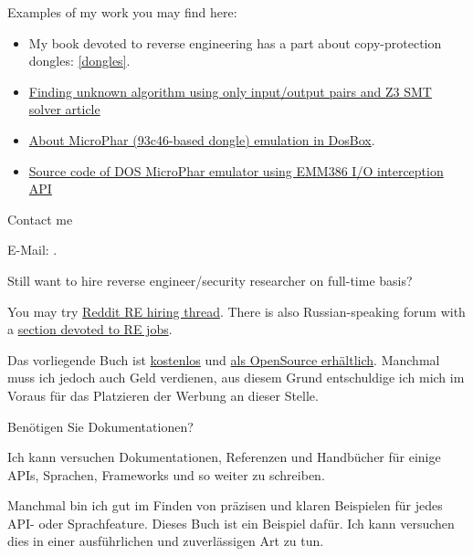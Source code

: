 Examples of my work you may find here:

\begin{itemize}
\item My book devoted to reverse engineering has a part about copy-protection dongles: \ref{dongles}.
\item \href{http://yurichev.com/writings/z3_rockey.pdf}{Finding unknown algorithm using only input/output pairs and Z3 SMT solver article}
\item \href{http://yurichev.com/blog/56/}{About MicroPhar (93c46-based dongle) emulation in DosBox}.
\item \href{http://conus.info/dongle/src/microph.asm}{Source code of DOS MicroPhar emulator using EMM386 I/O interception API}
\end{itemize}

\large Contact me \normalsize

E-Mail: \GTT{\EMAIL}.

\large Still want to hire reverse engineer/security researcher on full-time basis? \normalsize

You may try \href{https://www.reddit.com/r/ReverseEngineering/comments/49cza0/rreverseengineerings_2015_triannual_hiring_thread/}{Reddit RE hiring thread}.
There is also Russian-speaking forum with a \href{https://forum.reverse4you.org/forumdisplay.php?f=252}{section devoted to RE jobs}.

\fi %

\ifdefined\GERMAN

\bigskip
\bigskip
\bigskip

\huge
\normalsize

\bigskip
\bigskip
\bigskip

Das vorliegende Buch ist \href{http://beginners.re/}{kostenlos} und 
\href{https://github.com/dennis714/RE-for-beginners/}{als OpenSource erhältlich}.
Manchmal muss ich jedoch auch Geld verdienen, aus diesem Grund entschuldige ich mich im Voraus
für das Platzieren der Werbung an dieser Stelle.

\iffalse
\Large Benötigen Sie Dokumentationen? \normalsize

Ich kann versuchen Dokumentationen, Referenzen und Handbücher für einige APIs,
Sprachen, Frameworks und so weiter zu schreiben.

Manchmal bin ich gut im Finden von präzisen und klaren Beispielen für jedes API- oder Sprachfeature.
Dieses Buch ist ein Beispiel dafür.
Ich kann versuchen dies in einer ausführlichen und zuverlässigen Art zu tun.

